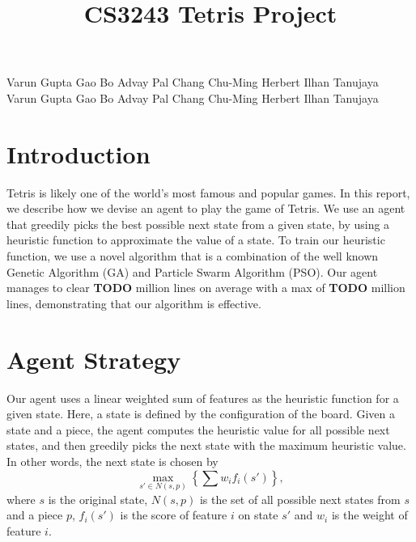 \documentclass[12pt]{article}
\title{CS3243 Tetris Project}
\author{}
\date{}
\begin{document}
	\vspace{-4cm}
	\maketitle
	\thispagestyle{empty}
	\vspace{-2.5cm}

	{\small Varun Gupta \;\;\;\;  Gao Bo \;\;\;\; Advay Pal \;\;\;\; Chang Chu-Ming \;\;\;\; Herbert Ilhan Tanujaya}\\
	{\small Varun Gupta \;\;\;\;  Gao Bo \;\;\;\; Advay Pal \;\;\;\; Chang Chu-Ming \;\;\;\; Herbert Ilhan Tanujaya}

    \section{Introduction}
    Tetris is likely one of the world's most famous and popular games.
    In this report, we describe how we devise an agent to play the game of Tetris.
    We use an agent that greedily picks the best possible next state from a given state,
    by using a heuristic function to approximate the value of a state. To train our heuristic
    function, we use a novel algorithm that is a combination of the well known Genetic Algorithm (GA)
    and Particle Swarm Algorithm (PSO). Our agent manages to clear \textbf{TODO} million lines on average with a max
    of \textbf{TODO} million lines, demonstrating that our algorithm is effective.

    \section{Agent Strategy}
	Our agent uses a linear weighted sum of features as the heuristic function for
	a given state. Here, a state is defined by the configuration of the board. Given a
	state and a piece, the agent computes the heuristic value for all possible next
	states, and then greedily picks the next state with the maximum heuristic
	value. In other words, the next state is chosen by \[ \max_{s' \in N(s, p)}
	\left\{ \sum w_i f_i(s') \right\}, \] where $s$ is the original state, $N(s,
	p)$ is the set of all possible next states from $s$ and a piece $p$, $f_i(s')$
	is the score of feature $i$ on state $s'$ and $w_i$ is the weight of feature
	$i$.
\end{document}
